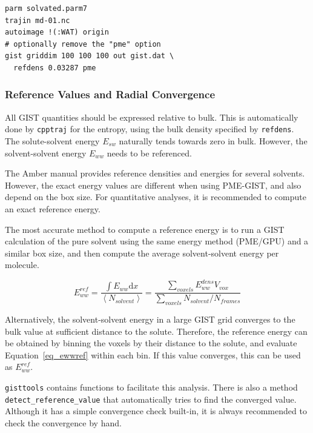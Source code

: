 \documentclass[9pt,tutorial]{livecoms}
\newcommand{\software}{\texttt}
\newcommand\inlinecode{\texttt}
\begin{document}
\begin{lstlisting}[style=cpptraj]
parm solvated.parm7
trajin md-01.nc
autoimage !(:WAT) origin
# optionally remove the "pme" option
gist griddim 100 100 100 out gist.dat \
  refdens 0.03287 pme
\end{lstlisting}

\subsubsection{Reference Values and Radial Convergence}
All GIST quantities should be expressed relative to bulk.
This is automatically done by \software{cpptraj} for the entropy, using the bulk density specified by \inlinecode{refdens}.
The solute-solvent energy $E_{sw}$ naturally tends towards zero in bulk.
However, the solvent-solvent energy $E_{ww}$ needs to be referenced.

The Amber manual provides reference densities and energies for several solvents.
However, the exact energy values are different when using PME-GIST, and also depend on the box size.
For quantitative analyses, it is recommended to compute an exact reference energy.

The most accurate method to compute a reference energy is to run a GIST calculation of the pure solvent using the same energy method (PME/GPU) and a similar box size, and then compute the average solvent-solvent energy per molecule.

\begin{equation}
\label{eq_ewwref}
E_{ww}^\textit{ref} = \frac{\int{E_{ww}} \mathrm{d}x}{\left<N_\textit{solvent}\right>}
  = \frac{\sum_\textit{voxels}E_{ww}^\textit{dens} V_\textit{vox}}{\sum_\textit{voxels}{N_\textit{solvent}} / N_\textit{frames}}
\end{equation}

Alternatively, the solvent-solvent energy in a large GIST grid converges to the bulk value at sufficient distance to the solute.
Therefore, the reference energy can be obtained by binning the voxels by their distance to the solute, and evaluate Equation~\ref{eq_ewwref} within each bin.
If this value converges, this can be used as $E_{ww}^\textit{ref}$.

\software{gisttools} contains functions to facilitate this analysis.
There is also a method \inlinecode{detect\_reference\_value} that automatically tries to find the converged value.
Although it has a simple convergence check built-in, it is always recommended to check the convergence by hand.
\end{document}
